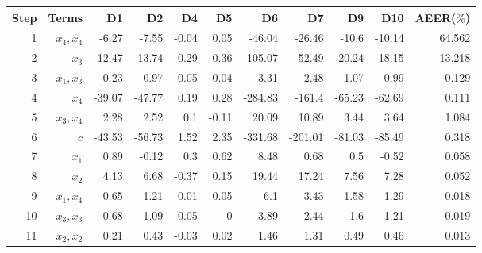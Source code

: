 \begin{tabular}{rrrrrrrrrrr}
Step & Terms & D1 & D2 & D4 & D5 & D6 & D7 & D9 & D10 & AEER($\%$) \\ 
\hline 
1 & $x_4,x_4$ & -6.27 & -7.55 & -0.04 & 0.05 & -46.04 & -26.46 & -10.6 & -10.14 & 64.562 \\ 
2 & $x_3$ & 12.47 & 13.74 & 0.29 & -0.36 & 105.07 & 52.49 & 20.24 & 18.15 & 13.218 \\ 
3 & $x_1,x_3$ & -0.23 & -0.97 & 0.05 & 0.04 & -3.31 & -2.48 & -1.07 & -0.99 & 0.129 \\ 
4 & $x_4$ & -39.07 & -47.77 & 0.19 & 0.28 & -284.83 & -161.4 & -65.23 & -62.69 & 0.111 \\ 
5 & $x_3,x_4$ & 2.28 & 2.52 & 0.1 & -0.11 & 20.09 & 10.89 & 3.44 & 3.64 & 1.084 \\ 
6 & $c$ & -43.53 & -56.73 & 1.52 & 2.35 & -331.68 & -201.01 & -81.03 & -85.49 & 0.318 \\ 
7 & $x_1$ & 0.89 & -0.12 & 0.3 & 0.62 & 8.48 & 0.68 & 0.5 & -0.52 & 0.058 \\ 
8 & $x_2$ & 4.13 & 6.68 & -0.37 & 0.15 & 19.44 & 17.24 & 7.56 & 7.28 & 0.052 \\ 
9 & $x_1,x_4$ & 0.65 & 1.21 & 0.01 & 0.05 & 6.1 & 3.43 & 1.58 & 1.29 & 0.018 \\ 
10 & $x_3,x_3$ & 0.68 & 1.09 & -0.05 & 0 & 3.89 & 2.44 & 1.6 & 1.21 & 0.019 \\ 
11 & $x_2,x_2$ & 0.21 & 0.43 & -0.03 & 0.02 & 1.46 & 1.31 & 0.49 & 0.46 & 0.013 \\ 
\hline 
\end{tabular}